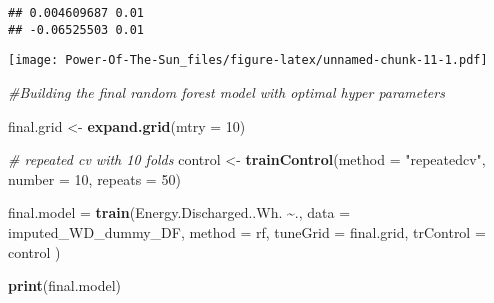 \documentclass[
]{article}
\newenvironment{Shaded}{\begin{snugshade}}{\end{snugshade}}
\newcommand{\AttributeTok}[1]{\textcolor[rgb]{0.13,0.29,0.53}{#1}}
\newcommand{\CommentTok}[1]{\textcolor[rgb]{0.56,0.35,0.01}{\textit{#1}}}
\newcommand{\ConstantTok}[1]{\textcolor[rgb]{0.56,0.35,0.01}{#1}}
\newcommand{\DecValTok}[1]{\textcolor[rgb]{0.00,0.00,0.81}{#1}}
\newcommand{\FloatTok}[1]{\textcolor[rgb]{0.00,0.00,0.81}{#1}}
\newcommand{\FunctionTok}[1]{\textcolor[rgb]{0.13,0.29,0.53}{\textbf{#1}}}
\newcommand{\NormalTok}[1]{#1}
\newcommand{\OtherTok}[1]{\textcolor[rgb]{0.56,0.35,0.01}{#1}}
\newcommand{\SpecialCharTok}[1]{\textcolor[rgb]{0.81,0.36,0.00}{\textbf{#1}}}
\newcommand{\StringTok}[1]{\textcolor[rgb]{0.31,0.60,0.02}{#1}}
\begin{document}
\begin{Shaded}
\end{Shaded}

\begin{verbatim}
## 0.004609687 0.01 
## -0.06525503 0.01
\end{verbatim}

\texttt{[image: Power-Of-The-Sun\_files/figure-latex/unnamed-chunk-11-1.pdf]}

\begin{Shaded}
\begin{Highlighting}[]
\CommentTok{\#Building the final random forest model with optimal hyper parameters}

\NormalTok{final.grid }\OtherTok{\textless{}{-}}  \FunctionTok{expand.grid}\NormalTok{(}\AttributeTok{mtry =} \DecValTok{10}\NormalTok{)}

\CommentTok{\# repeated cv with 10 folds}
\NormalTok{control }\OtherTok{\textless{}{-}} \FunctionTok{trainControl}\NormalTok{(}\AttributeTok{method =} \StringTok{"repeatedcv"}\NormalTok{,}
                        \AttributeTok{number =} \DecValTok{10}\NormalTok{,}
                        \AttributeTok{repeats =} \DecValTok{50}\NormalTok{)}


\NormalTok{final.model }\OtherTok{=} \FunctionTok{train}\NormalTok{(Energy.Discharged..Wh. }\SpecialCharTok{\textasciitilde{}}\NormalTok{.,}
              \AttributeTok{data =}\NormalTok{ imputed\_WD\_dummy\_DF,}
              \AttributeTok{method =} \StringTok{\textquotesingle{}rf\textquotesingle{}}\NormalTok{,}
              \AttributeTok{tuneGrid =}\NormalTok{ final.grid,}
              \AttributeTok{trControl =}\NormalTok{ control}
\NormalTok{)}

\FunctionTok{print}\NormalTok{(final.model)}
\end{Highlighting}
\end{Shaded}
\end{document}
